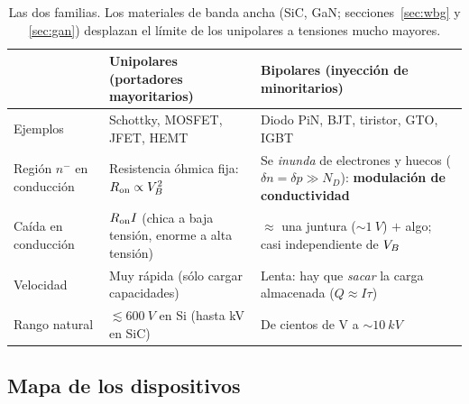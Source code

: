 \begin{table}[H]
\centering\small
\begin{tabularx}{\textwidth}{>{\raggedright\arraybackslash}p{2.7cm}>{\raggedright\arraybackslash}X>{\raggedright\arraybackslash}X}
\toprule
 & \textbf{Unipolares} (portadores mayoritarios) & \textbf{Bipolares} (inyección de minoritarios) \\
\midrule
Ejemplos & Schottky, MOSFET, JFET, HEMT & Diodo PiN, BJT, tiristor, GTO, IGBT \\
Región $n^-$ en conducción & Resistencia óhmica fija: $R_{\mathrm{on}}\propto V_{B}^2$ & Se \emph{inunda} de electrones y huecos
($\delta n=\delta p\gg N_D$): \textbf{modulación de conductividad} \\
Caída en conducción & $R_{\mathrm{on}} I$ (chica a baja tensión, enorme a alta tensión) & $\approx$ una juntura
($\sim\SI{1}{V}$) $+$ algo; casi independiente de $V_{B}$ \\
Velocidad & Muy rápida (sólo cargar capacidades) & Lenta: hay que \emph{sacar} la carga almacenada
($Q\approx I\tau$) \\
Rango natural & $\lesssim\SI{600}{V}$ en Si (hasta kV en SiC) & De cientos de V a $\sim\SI{10}{kV}$ \\
\bottomrule
\end{tabularx}
\caption{Las dos familias. Los materiales de banda ancha (SiC, GaN; secciones~\ref{sec:wbg} y
\ref{sec:gan}) desplazan el límite de los unipolares a tensiones mucho mayores.}
\label{tab:uni-bi}
\end{table}

\subsection{Mapa de los dispositivos}

